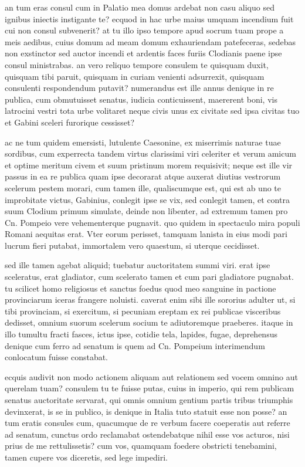  an tum eras consul cum in Palatio mea domus ardebat non casu aliquo sed ignibus iniectis instigante te? ecquod in hac urbe maius umquam incendium fuit cui non consul subvenerit? at tu illo ipso tempore apud socrum tuam prope a meis aedibus, cuius domum ad meam domum exhauriendam patefeceras, sedebas non exstinctor sed auctor incendi et ardentis faces furiis Clodianis paene ipse consul ministrabas. an vero reliquo tempore consulem te quisquam duxit, quisquam tibi paruit, quisquam in curiam venienti adsurrexit, quisquam consulenti respondendum putavit? numerandus est ille annus denique in re publica, cum obmutuisset senatus, iudicia conticuissent, maererent boni, vis latrocini vestri tota urbe volitaret neque civis unus ex civitate sed ipsa civitas tuo et Gabini sceleri furorique cessisset?

 ac ne tum quidem emersisti, lutulente Caesonine, ex miserrimis naturae tuae sordibus, cum experrecta tandem virtus clarissimi viri celeriter et verum amicum et optime meritum civem et suum pristinum morem requisivit; neque est ille vir passus in ea re publica quam ipse decorarat atque auxerat diutius vestrorum scelerum pestem morari, cum tamen ille, qualiscumque est, qui est ab uno te improbitate victus, Gabinius, conlegit ipse se vix, sed conlegit tamen, et contra suum Clodium primum simulate, deinde non libenter, ad extremum tamen pro Cn. Pompeio vere vehementerque pugnavit. quo quidem in spectaculo mira populi Romani aequitas erat. Vter eorum perisset, tamquam lanista in eius modi pari lucrum fieri putabat, immortalem vero quaestum, si uterque cecidisset.

 sed ille tamen agebat aliquid; tuebatur auctoritatem summi viri. erat ipse sceleratus, erat gladiator, cum scelerato tamen et cum pari gladiatore pugnabat. tu scilicet homo religiosus et sanctus foedus quod meo sanguine in pactione provinciarum iceras frangere noluisti. caverat enim sibi ille sororius adulter ut, si tibi provinciam, si exercitum, si pecuniam ereptam ex rei publicae visceribus dedisset, omnium suorum scelerum socium te adiutoremque praeberes. itaque in illo tumultu fracti fasces, ictus ipse, cotidie tela, lapides, fugae, deprehensus denique cum ferro ad senatum is quem ad Cn. Pompeium interimendum conlocatum fuisse constabat.

 ecquis audivit non modo actionem aliquam aut relationem sed vocem omnino aut querelam tuam? consulem tu te fuisse putas, cuius in imperio, qui rem publicam senatus auctoritate servarat, qui omnis omnium gentium partis tribus triumphis devinxerat, is se in publico, is denique in Italia tuto statuit esse non posse? an tum eratis consules cum, quacumque de re verbum facere coeperatis aut referre ad senatum, cunctus ordo reclamabat ostendebatque nihil esse vos acturos, nisi prius de me rettulissetis? cum vos, quamquam foedere obstricti tenebamini, tamen cupere vos diceretis, sed lege impediri.

